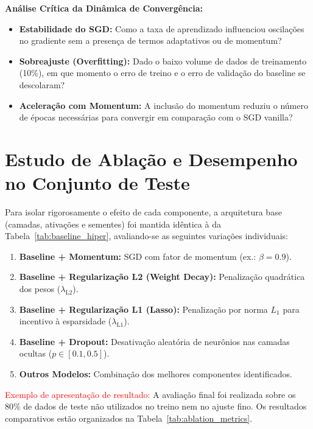 \documentclass[11pt,a4paper]{article}
\begin{document}
\textbf{Análise Crítica da Dinâmica de Convergência:}
\begin{itemize}
    \item \textbf{Estabilidade do SGD:} Como a taxa de aprendizado influenciou oscilações no gradiente sem a presença de termos adaptativos ou de momentum?
    \item \textbf{Sobreajuste (Overfitting):} Dado o baixo volume de dados de treinamento (10\%), em que momento o erro de treino e o erro de validação do baseline se descolaram?
    \item \textbf{Aceleração com Momentum:} A inclusão do momentum reduziu o número de épocas necessárias para convergir em comparação com o SGD vanilla?
\end{itemize}

\section{Estudo de Ablação e Desempenho no Conjunto de Teste}

Para isolar rigorosamente o efeito de cada componente, a arquitetura base (camadas, ativações e sementes) foi mantida idêntica à da Tabela~\ref{tab:baseline_hiper}, avaliando-se as seguintes variações individuais:
\begin{enumerate}
    \item \textbf{Baseline + Momentum:} SGD com fator de momentum (ex.: $\beta = 0.9$).
    \item \textbf{Baseline + Regularização L2 (Weight Decay):} Penalização quadrática dos pesos ($\lambda_{\text{L2}}$).
    \item \textbf{Baseline + Regularização L1 (Lasso):} Penalização por norma $L_1$ para incentivo à esparsidade ($\lambda_{\text{L1}}$).
    \item \textbf{Baseline + Dropout:} Desativação aleatória de neurônios nas camadas ocultas ($p \in [0.1, 0.5]$).
    \item \textbf{Outros Modelos:} Combinação dos melhores componentes identificados.
\end{enumerate}

\textcolor{red}{Exemplo de apresentação de resultado: } A avaliação final foi realizada sobre os 80\% de dados de teste não utilizados no treino nem no ajuste fino. Os resultados comparativos estão organizados na Tabela~\ref{tab:ablation_metrics}.
\end{document}
